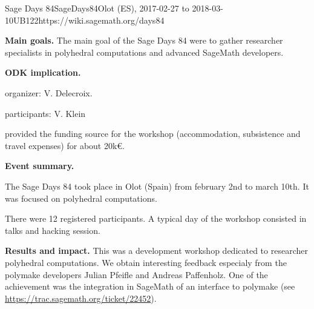 \begin{event}{Sage Days 84}{SageDays84}{Olot (ES),
2017-02-27 to 2018-03-10}{UB}{12}{2}{https://wiki.sagemath.org/days84}

\textbf{Main goals.}
The main goal of the Sage Days 84 were to
gather researcher specialists in polyhedral computations and advanced
SageMath developers.

\textbf{ODK implication.} 

\ODK organizer: V. Delecroix.

\ODK participants: V. Klein

\ODK provided the funding source for the workshop (accommodation,
subsistence and travel expenses) for about 20k\euro.

\textbf{Event summary.} 

The Sage Days 84 took place in Olot (Spain) from february 2nd to
march 10th. It was focused on polyhedral computations.

There were 12 registered participants. A typical day of the workshop
consisted in talks and hacking session.

\textbf{Results and impact.} 
This was a development workshop dedicated to researcher polyhedral
computations. We obtain interesting feedback especialy from
the polymake developers Julian Pfeifle and Andreas Paffenholz. One
of the achievement was the integration in SageMath of an interface
to polymake
(see \url{https://trac.sagemath.org/ticket/22452}).
\end{event}
